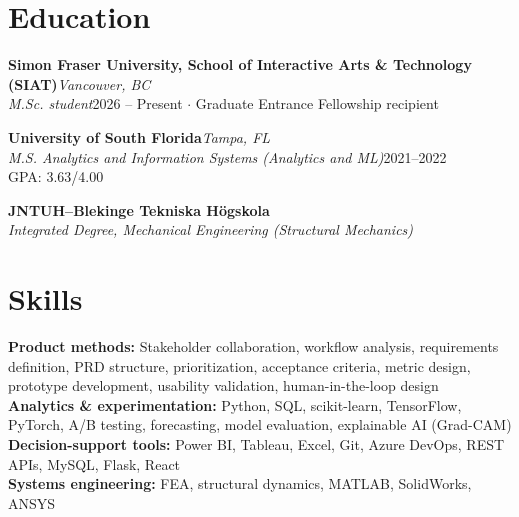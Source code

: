 \documentclass[10pt,a4paper]{article}
\begin{document}
\section{Education}
\textbf{Simon Fraser University, School of Interactive Arts \& Technology (SIAT)}\hfill\textit{Vancouver, BC}\\
\textit{M.Sc. student}\hfill 2026 -- Present $\cdot$ Graduate Entrance Fellowship recipient\par
\textbf{University of South Florida}\hfill\textit{Tampa, FL}\\
\textit{M.S. Analytics and Information Systems (Analytics and ML)}\hfill 2021--2022\\GPA: 3.63/4.00\par
\textbf{JNTUH--Blekinge Tekniska H\"ogskola}\\
\textit{Integrated Degree, Mechanical Engineering (Structural Mechanics)}
\section{Skills}
\textbf{Product methods:} Stakeholder collaboration, workflow analysis, requirements definition, PRD structure, prioritization, acceptance criteria, metric design, prototype development, usability validation, human-in-the-loop design\\
\textbf{Analytics \& experimentation:} Python, SQL, scikit-learn, TensorFlow, PyTorch, A/B testing, forecasting, model evaluation, explainable AI (Grad-CAM)\\
\textbf{Decision-support tools:} Power BI, Tableau, Excel, Git, Azure DevOps, REST APIs, MySQL, Flask, React\\
\textbf{Systems engineering:} FEA, structural dynamics, MATLAB, SolidWorks, ANSYS
\end{document}
